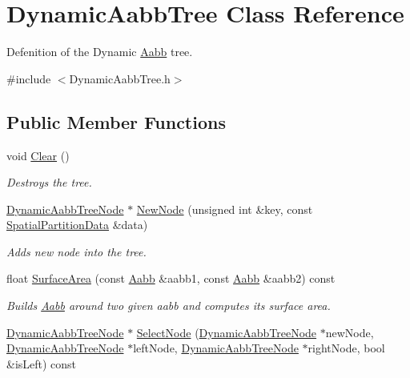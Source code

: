\hypertarget{classDynamicAabbTree}{}\section{Dynamic\+Aabb\+Tree Class Reference}
\label{classDynamicAabbTree}


Defenition of the Dynamic \hyperlink{classAabb}{Aabb} tree.  




{\ttfamily \#include $<$Dynamic\+Aabb\+Tree.\+h$>$}

\subsection*{Public Member Functions}
\begin{DoxyCompactItemize}
\item 
\mbox{\label{classDynamicAabbTree_af94357cbb891f9e969f742b24e3ffb70}} 
void \hyperlink{classDynamicAabbTree_af94357cbb891f9e969f742b24e3ffb70}{Clear} ()
\begin{DoxyCompactList}\small\item\em Destroys the tree. \end{DoxyCompactList}\item 
\hyperlink{classDynamicAabbTreeNode}{Dynamic\+Aabb\+Tree\+Node} $\ast$ \hyperlink{classDynamicAabbTree_a32d608fc624edf024e369a7ac334d1e7}{New\+Node} (unsigned int \&key, const \hyperlink{classSpatialPartitionData}{Spatial\+Partition\+Data} \&data)
\begin{DoxyCompactList}\small\item\em Adds new node into the tree. \end{DoxyCompactList}\item 
float \hyperlink{classDynamicAabbTree_a6ba7bea87bd61579da6ee83f744cee00}{Surface\+Area} (const \hyperlink{classAabb}{Aabb} \&aabb1, const \hyperlink{classAabb}{Aabb} \&aabb2) const
\begin{DoxyCompactList}\small\item\em Builds \hyperlink{classAabb}{Aabb} around two given aabb and computes its surface area. \end{DoxyCompactList}\item 
\hyperlink{classDynamicAabbTreeNode}{Dynamic\+Aabb\+Tree\+Node} $\ast$ \hyperlink{classDynamicAabbTree_acc10af3765dfe7db89416e87f9c0c304}{Select\+Node} (\hyperlink{classDynamicAabbTreeNode}{Dynamic\+Aabb\+Tree\+Node} $\ast$new\+Node, \hyperlink{classDynamicAabbTreeNode}{Dynamic\+Aabb\+Tree\+Node} $\ast$left\+Node, \hyperlink{classDynamicAabbTreeNode}{Dynamic\+Aabb\+Tree\+Node} $\ast$right\+Node, bool \&is\+Left) const

\end{DoxyCompactItemize}
